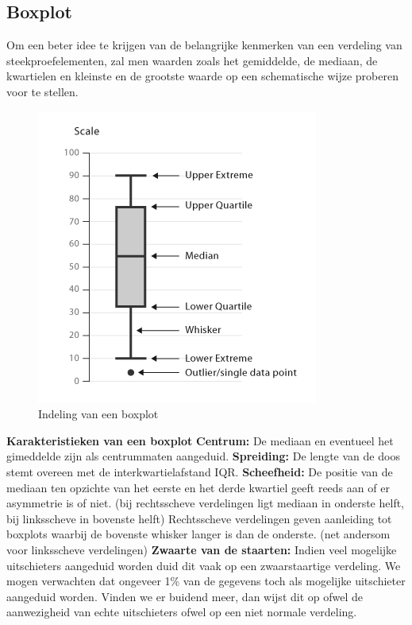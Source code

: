 \documentclass[titlepage]{article}
\numberwithin{equation}{section}
\begin{document}
\subsection{Boxplot}
Om een beter idee te krijgen van de belangrijke kenmerken van een verdeling van steekproefelementen, zal men waarden zoals het gemiddelde, de mediaan, de kwartielen en kleinste en de grootste waarde op een schematische wijze proberen voor te stellen.
\begin{figure}[H]
\caption{Indeling van een boxplot}
	\includegraphics[scale=0.75]{images/boxplot}
\end{figure}
\textbf{Karakteristieken van een boxplot}\newline\newline
\textbf{Centrum:} De mediaan en eventueel het gimeddelde zijn als centrummaten aangeduid.\newline
\textbf{Spreiding:} De lengte van de doos stemt overeen met de interkwartielafstand IQR.\newline
\textbf{Scheefheid:} De positie van de mediaan ten opzichte van het eerste en het derde kwartiel geeft reeds aan of er asymmetrie is of niet. (bij rechtsscheve verdelingen ligt mediaan in onderste helft, bij linksscheve in bovenste helft) Rechtsscheve verdelingen geven aanleiding tot boxplots waarbij de bovenste whisker langer is dan de onderste. (net andersom voor linksscheve verdelingen)\newline
\textbf{Zwaarte van de staarten:} Indien veel mogelijke uitschieters aangeduid worden duid dit vaak op een zwaarstaartige verdeling. We mogen verwachten dat ongeveer 1\% van de gegevens
 toch als mogelijke uitschieter aangeduid worden. Vinden we er buidend meer, dan wijst dit op ofwel de aanwezigheid van echte uitschieters ofwel op een niet normale verdeling.\newline\newline
\end{document}
